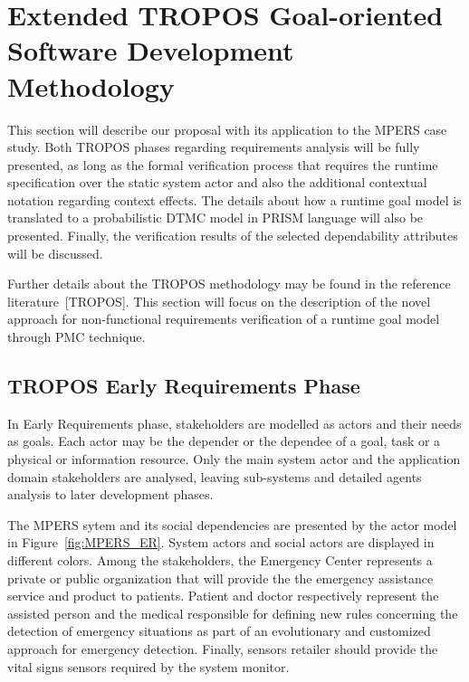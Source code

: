 \chapter{Extended TROPOS Goal-oriented Software Development Methodology}\label{ch_proposal}

This section will describe our proposal with its application to the MPERS case study. Both TROPOS phases regarding requirements analysis will be fully presented, as long as the formal verification process that requires the runtime specification over the static system actor and also the additional contextual notation regarding context effects. The details about how a runtime goal model is translated to a probabilistic DTMC model in PRISM language will also be presented. Finally, the verification results of the selected dependability attributes will be discussed.

Further details about the TROPOS methodology may be found in the reference literature~[TROPOS]. This section will focus on the description of the novel approach for non-functional requirements verification of a runtime goal model through PMC technique.

\section{TROPOS Early Requirements Phase}

In Early Requirements phase, stakeholders are modelled as actors and their needs as goals. Each actor may be the depender or the dependee of a goal, task or a physical or information resource. Only the main system actor and the application domain stakeholders are analysed, leaving sub-systems and detailed agents analysis to later development phases.

The MPERS sytem and its social dependencies are presented by the actor model in Figure~\ref{fig:MPERS_ER}. System actors and social actors are displayed in different colors. Among the stakeholders, the Emergency Center represents a private or public organization that will provide the the emergency assistance service and product to patients. Patient and doctor respectively represent the assisted person and the medical responsible for defining new rules concerning the detection of emergency situations as part of an evolutionary and customized approach for emergency detection. Finally, sensors retailer should provide the vital signs sensors required by the system monitor.

